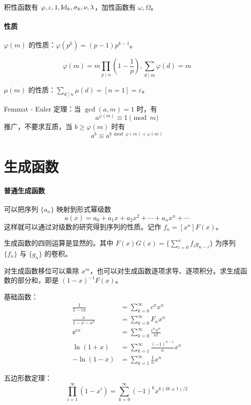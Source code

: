 \documentclass{pureart}
\begin{document}
积性函数有 $\varphi,\varepsilon,1,\operatorname{Id}_k,\sigma_k,\nu,\lambda$，加性函数有 $\omega,\Omega$。

\paragraph{性质}
$\varphi(m)$ 的性质：$\varphi(p^k) = (p-1)p^{k-1}$。

\[ \varphi(m) = m \prod_{p \mid n}\left( 1-\frac{1}{p} \right), \sum_{d \mid m} \varphi(d) = m \]

$\mu(m)$ 的性质：$\sum\limits_{d \mid n} \mu(d) = [n=1] = \varepsilon$。

Femmat - Euler 定理：当 $\gcd(a,m) = 1$ 时，有
\[ a^{\varphi(m)} \equiv 1 \pmod m \]
推广，不要求互质，当 $b \geqslant \varphi(m)$ 时有
\[ a^b \equiv a^{b \bmod \varphi(m) + \varphi(m) } \]


\section{生成函数}

\paragraph{普通生成函数}
可以把序列 $\{a_n\}$ 映射到形式幂级数
\[ a(x) = a_0 + a_1 x + a_2 x^2 + \cdots + a_nx^n + \cdots \]
这样就可以通过对级数的研究得到序列的性质。记作 $f_n = [x^n]F(x)$。

生成函数的四则运算是显然的。其中 $F(x)G(x) = \{\sum\limits_{i=0}^n f_ig_{n-i}\}$ 为序列 $\{f_n\}$ 与 $\{g_n\}$ 的卷积。

对生成函数移位可以乘除 $x^m$，也可以对生成函数逐项求导、逐项积分。求生成函数的部分和，即是 $(1-x)^{-1}F(x)$。

基础函数：
\begin{equation*}
    \begin{aligned}
        \frac{1}{1-cx} &= \sum_{k=0}^\infty c^nx^n\\
        \frac{x}{1-x-x^2} &= \sum_{k=0}^\infty F_nx^n \\
        \ee^{cx} &= \sum_{k=0}^\infty \frac{c^nx^n}{n!} \\
        \ln(1+x) &= \sum_{k=1}^\infty \frac{(-1)^{n-1}}{n} x^n\\
        -\ln(1-x) &= \sum_{k=1}^\infty \frac{1}{n} x^n
    \end{aligned}
\end{equation*}

五边形数定理：
\[ \prod_{i=1}^\infty (1-x^i) = \sum_{k=0}^{\infty} (-1)^k x^{k(3k \pm 1) /2} \]
\end{document}
